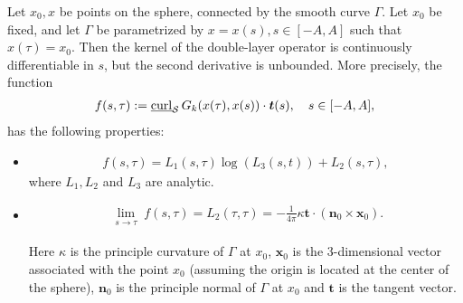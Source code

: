 \begin{lemma}
\label{regularity}
Let $x_0,x$ be points on the sphere, connected by the smooth curve
$\Gamma$. Let $x_0$ be fixed, and let $\Gamma$ be parametrized by
$x=x(s), s\in[-A,A]$ such that $x(\tau)=x_{0}$. Then the kernel of the
double-layer operator is continuously differentiable in $s$, but the
second derivative is unbounded. More precisely, the function 
\begin{align*}
  f(s,\tau):=\underline{\mbox{curl}}_{\S}\,
    G_{k}(x(\tau),x(s))\cdot\vec{t}(s), \quad s\in[-A,A],
\end{align*}
has the following properties:
\begin{itemize}
\item 
\begin{align*}
  f(s,\tau) = L_{1}(s,\tau) \log(L_{3}(s,t)) + L_{2}(s,\tau),
\end{align*}
where $L_{1}, L_{2}$ and $L_{3}$ are analytic.
\item 
\begin{align*} 
  \lim_{\substack {s \rightarrow \tau}} f(s,\tau) =
    L_{2}(\tau,\tau) =  -\frac{1}{4\pi} 
    \kappa \mathbf{t}\cdot(\mathbf{n}_{0} \times \mathbf{x}_{0}).
\end{align*}

Here $\kappa$ is the principle curvature of $\Gamma$ at $x_{0}$,
$\mathbf{x}_{0}$ is the 3-dimensional vector associated with the point
$x_{0}$ (assuming the origin is located at the center of the sphere),
$\mathbf{n}_{0}$ is the principle normal of $\Gamma$ at $x_0$ and
$\mathbf{t}$ is the tangent vector.
\end{itemize}
\end{lemma}

